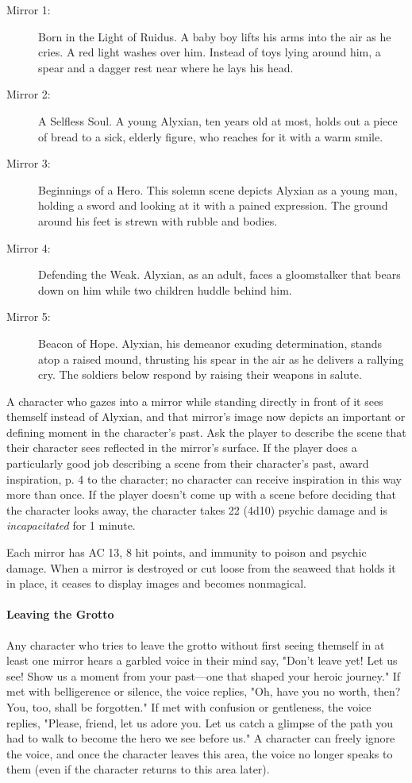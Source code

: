 \documentclass[a4paper, 11pt, bg=full, twocolumn, nooutline]{dndbook}
\begin{document}
\begin{description}
\item[Mirror 1:] Born in the Light of Ruidus. A baby boy lifts his arms into the air as he cries. A red light washes over him. Instead of toys lying around him, a spear and a dagger rest near where he lays his head.
\item[Mirror 2:] A Selfless Soul. A young Alyxian, ten years old at most, holds out a piece of bread to a sick, elderly figure, who reaches for it with a warm smile.
\item[Mirror 3:] Beginnings of a Hero. This solemn scene depicts Alyxian as a young man, holding a sword and looking at it with a pained expression. The ground around his feet is strewn with rubble and bodies.
\item[Mirror 4:] Defending the Weak. Alyxian, as an adult, faces a gloomstalker that bears down on him while two children huddle behind him.
\item[Mirror 5:] Beacon of Hope. Alyxian, his demeanor exuding determination, stands atop a raised mound, thrusting his spear in the air as he delivers a rallying cry. The soldiers below respond by raising their weapons in salute.
\end{description}

A character who gazes into a mirror while standing directly in front of it sees themself instead of Alyxian, and that mirror's image now depicts an important or defining moment in the character's past. Ask the player to describe the scene that their character sees reflected in the mirror's surface. If the player does a particularly good job describing a scene from their character's past, award inspiration, p. 4 to the character; no character can receive inspiration in this way more than once. If the player doesn't come up with a scene before deciding that the character looks away, the character takes 22 (4d10) psychic damage and is \textit{incapacitated} for 1 minute.

Each mirror has AC 13, 8 hit points, and immunity to poison and psychic damage. When a mirror is destroyed or cut loose from the seaweed that holds it in place, it ceases to display images and becomes nonmagical.

\paragraph{Leaving the Grotto}

Any character who tries to leave the grotto without first seeing themself in at least one mirror hears a garbled voice in their mind say, "Don't leave yet! Let us see! Show us a moment from your past---one that shaped your heroic journey." If met with belligerence or silence, the voice replies, "Oh, have you no worth, then? You, too, shall be forgotten." If met with confusion or gentleness, the voice replies, "Please, friend, let us adore you. Let us catch a glimpse of the path you had to walk to become the hero we see before us." A character can freely ignore the voice, and once the character leaves this area, the voice no longer speaks to them (even if the character returns to this area later).
\end{document}
